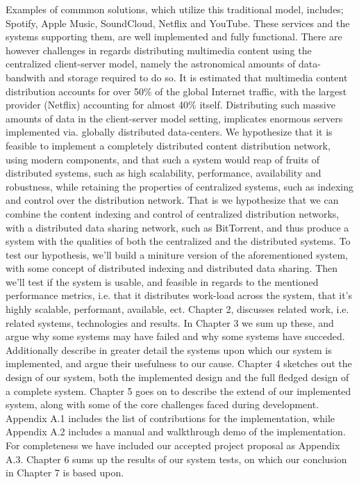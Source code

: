 Examples of commmon solutions, which utilize this traditional model, includes;
Spotify, Apple Music, SoundCloud, Netflix and YouTube.
\newline
These services and the systems supporting them, are well implemented and
fully functional. There are however challenges in regards distributing
multimedia content using the centralized client-server model, namely the 
astronomical amounts of data-bandwith and storage required to do so.
\newline
It is estimated that multimedia content distribution accounts for over 50\% of
the global Internet traffic, with the largest provider (Netflix) accounting for
almost 40\% itself\citep{sandvine:2015}.
\newline
Distributing such massive amounts of data in the client-server model setting, 
implicates enormous servers implemented via. globally distributed data-centers.
\newline\newline
We hypothesize that it is feasible to implement a completely distributed
content distribution network, using modern components, and that such a system
would reap of fruits of distributed systems, such as high scalability, 
performance, availability and robustness, while retaining the properties of 
centralized systems, such as indexing and control over the distribution network.
\newline
That is we hypothesize that we can combine the content indexing and control of
centralized distribution networks, with a distributed data sharing network,
such as BitTorrent, and thus produce a system with the qualities of both the
centralized and the distributed systems.
\newline\newline
To test our hypothesis, we'll build a miniture version of the aforementioned
system, with some concept of distributed indexing and distributed data
sharing.
\newline
Then we'll test if the system is usable, and feasible in regards to the
mentioned performance metrics, i.e. that it distributes work-load across the
system, that it's highly scalable, performant, available, ect.
\newline\newline
Chapter 2, discusses related work, i.e. related systems, technologies and 
results. In Chapter 3 we sum up these, and argue why some systems may have
failed and why some systems have succeded. Additionally describe in greater
detail the systems upon which our system is implemented, and argue their
usefulness to our cause. Chapter 4 sketches out the design of our system, both 
the implemented design and the full fledged design of a complete system.
Chapter 5 goes on to describe the extend of our implemented system, along with
some of the core challenges faced during development.
Appendix A.1 includes the list of contributions for the implementation, while
Appendix A.2 includes a manual and walkthrough demo of the implementation. For
completeness we have included our accepted project proposal as Appendix A.3.
Chapter 6 sums up the results of our system tests, on which our conclusion in
Chapter 7 is based upon.
